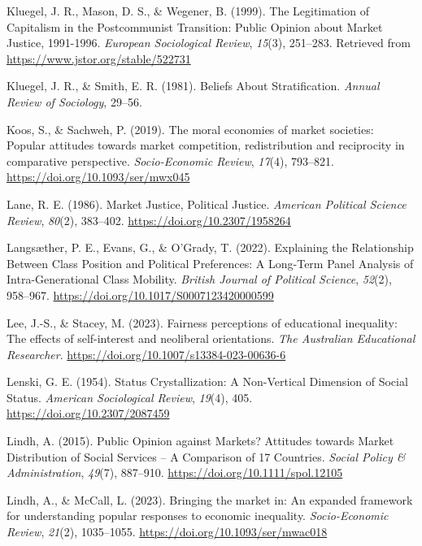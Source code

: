 \documentclass[
  12pt,
]{article}
\newlength{\cslhangindent}
\newenvironment{CSLReferences}[2] %
 {\begin{list}{}{%
  \setlength{\itemindent}{0pt}
  \setlength{\leftmargin}{0pt}
  \setlength{\parsep}{0pt}
  \ifodd #1
   \setlength{\leftmargin}{\cslhangindent}
   \setlength{\itemindent}{-1\cslhangindent}
  \fi
  \setlength{\itemsep}{#2\baselineskip}}}
 {\end{list}}
\begin{document}
\begin{CSLReferences}{1}{0}
Kluegel, J. R., Mason, D. S., \& Wegener, B. (1999). The {Legitimation}
of {Capitalism} in the {Postcommunist Transition}: {Public Opinion}
about {Market Justice}, 1991-1996. \emph{European Sociological Review},
\emph{15}(3), 251--283. Retrieved from
\url{https://www.jstor.org/stable/522731}

Kluegel, J. R., \& Smith, E. R. (1981). Beliefs {About Stratification}.
\emph{Annual Review of Sociology}, 29--56.

Koos, S., \& Sachweh, P. (2019). The moral economies of market
societies: Popular attitudes towards market competition, redistribution
and reciprocity in comparative perspective. \emph{Socio-Economic
Review}, \emph{17}(4), 793--821.
\url{https://doi.org/10.1093/ser/mwx045}

Lane, R. E. (1986). Market {Justice}, {Political Justice}.
\emph{American Political Science Review}, \emph{80}(2), 383--402.
\url{https://doi.org/10.2307/1958264}

Langsæther, P. E., Evans, G., \& O'Grady, T. (2022). Explaining the
{Relationship Between Class Position} and {Political Preferences}: {A
Long-Term Panel Analysis} of {Intra-Generational Class Mobility}.
\emph{British Journal of Political Science}, \emph{52}(2), 958--967.
\url{https://doi.org/10.1017/S0007123420000599}

Lee, J.-S., \& Stacey, M. (2023). Fairness perceptions of educational
inequality: The effects of self-interest and neoliberal orientations.
\emph{The Australian Educational Researcher}.
\url{https://doi.org/10.1007/s13384-023-00636-6}

Lenski, G. E. (1954). Status {Crystallization}: {A Non-Vertical
Dimension} of {Social Status}. \emph{American Sociological Review},
\emph{19}(4), 405. \url{https://doi.org/10.2307/2087459}

Lindh, A. (2015). Public {Opinion} against {Markets}? {Attitudes}
towards {Market Distribution} of {Social Services} -- {A Comparison} of
17 {Countries}. \emph{Social Policy \& Administration}, \emph{49}(7),
887--910. \url{https://doi.org/10.1111/spol.12105}

Lindh, A., \& McCall, L. (2023). Bringing the market in: An expanded
framework for understanding popular responses to economic inequality.
\emph{Socio-Economic Review}, \emph{21}(2), 1035--1055.
\url{https://doi.org/10.1093/ser/mwac018}


\end{CSLReferences}
\end{document}
